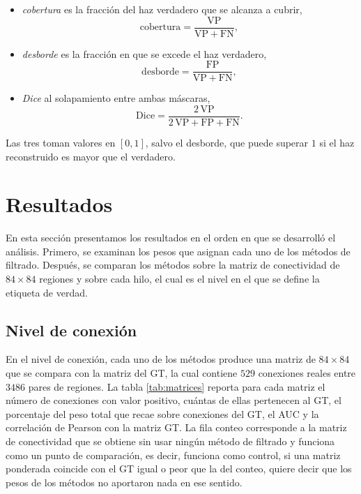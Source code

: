 \documentclass[11pt,a4paper]{article}
\begin{document}
\begin{tcolorbox}[colback=blue!5!white, colframe=blue!75!black,
                  title=M\'etricas por haz]
\begin{itemize}
    \item \textit{cobertura} es la fracci\'on del haz verdadero que se alcanza a cubrir,
\[
    \mathrm{cobertura}=\frac{\mathrm{VP}}{\mathrm{VP}+\mathrm{FN}},
\]
    \item \textit{desborde} es la fracci\'on en que se excede el haz verdadero,
\[
    \mathrm{desborde}=\frac{\mathrm{FP}}{\mathrm{VP}+\mathrm{FN}},
\]
    \item \textit{Dice} al solapamiento entre ambas m\'ascaras,
\[
    \mathrm{Dice}=\frac{2\,\mathrm{VP}}{2\,\mathrm{VP}+\mathrm{FP}+\mathrm{FN}} .
\]
\end{itemize}
Las tres toman valores en $[0,1]$, salvo el desborde, que puede superar $1$ si el haz
reconstruido es mayor que el verdadero.
\end{tcolorbox}

\section{Resultados}
\label{sec:resultados}
En esta sección presentamos los resultados en el orden en que se desarrolló el análisis. Primero, se examinan los pesos que asignan cada uno de los métodos de filtrado. Después, se comparan los métodos sobre la matriz de conectividad de $84 \times 84$ regiones y sobre cada hilo, el cual es el nivel en el que se define la etiqueta de verdad. 

\subsection{Nivel de conexi\'on}

En el nivel de conexión, cada uno de los métodos produce una matriz de $84\times 84$ que se compara con la matriz del GT, la cual contiene $529$ conexiones reales entre $3486$ pares de regiones. La tabla \ref{tab:matrices} reporta para cada matriz el número de conexiones con valor positivo, cuántas de ellas pertenecen al GT, el porcentaje del peso total que recae sobre conexiones del GT, el AUC y la correlación de Pearson con la matriz GT. La fila conteo corresponde a la matriz de conectividad que se obtiene sin usar ningún método de filtrado y funciona como un punto de comparación, es decir, funciona como control, si una matriz ponderada coincide con el GT igual o peor que la del conteo, quiere decir que los pesos de los métodos no aportaron nada en ese sentido. 
\end{document}
